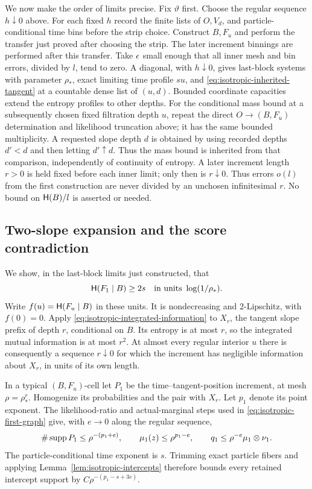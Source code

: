 We now make the order of limits precise. Fix $\vartheta$ first. Choose the regular
sequence $h\downarrow0$ above. For each fixed $h$ record the finite lists of
$O,V_d$, and particle-conditional time bins before the strip choice.
Construct $B,F_u$ and perform the transfer just proved after choosing the
strip. The later increment binnings are performed after this transfer.
Take $\epsilon$ small enough that all inner mesh and bin errors, divided by $l$,
tend to zero. A diagonal,
with $h\downarrow0$, gives last-block systems with parameter $\rho_*$, exact
limiting time profile $su$, and \eqref{eq:isotropic-inherited-tangent} at a
countable dense list of $(u,d)$. Bounded coordinate capacities extend the
entropy profiles to other depths. For the conditional mass bound at a
subsequently chosen fixed filtration depth $u$, repeat the direct
$O\to(B,F_u)$ determination and likelihood truncation above; it has the
same bounded multiplicity. A requested slope depth $d$ is obtained by
using recorded depths $d'<d$ and then letting $d'\uparrow d$.
Thus the mass bound is inherited from that comparison, independently
of continuity of entropy. A later increment length $r>0$ is held fixed before
each inner limit; only then is $r\downarrow0$. Thus errors $o(l)$ from the
first construction are never divided by an unchosen infinitesimal $r$.
No bound on $\mathsf H(B)/l$ is asserted or needed.

\subsection{Two-slope expansion and the score contradiction}

We show, in the last-block limits just constructed, that
\begin{equation}
 \mathsf H(F_1\mid B)\geq2s
 \quad\text{in units }\log(1/\rho_*).
 \label{eq:isotropic-last-entropy}
\end{equation}
Write $f(u)=\mathsf H(F_u\mid B)$ in these units. It is nondecreasing and
$2$-Lipschitz, with $f(0)=0$. Apply
\eqref{eq:isotropic-integrated-information} to $X_r$, the tangent slope
prefix of depth $r$, conditional on $B$. Its entropy is at most $r$, so the
integrated mutual information is at most $r^2$. At almost every regular
interior $u$ there is consequently a sequence $r\downarrow0$ for which the
increment has negligible information about $X_r$, in units of its own length.

In a typical $(B,F_u)$-cell let $P_1$ be the time--tangent-position increment,
at mesh $\rho=\rho_*^r$. Homogenize its probabilities and the pair with $X_r$.
Let $p_1$ denote its point exponent. The likelihood-ratio and actual-marginal
steps used in \eqref{eq:isotropic-first-graph} give, with $e\to0$ along the
regular sequence,
\[
 \#\operatorname{supp} P_1\leq\rho^{-(p_1+e)},\qquad
 \mu_1(z)\leq\rho^{p_1-e},\qquad
 q_1\leq\rho^{-e}\mu_1\otimes\nu_1.
\]
The particle-conditional time exponent is $s$. Trimming exact particle
fibers and applying Lemma~\ref{lem:isotropic-intercepts} therefore bounds
every retained intercept support by $C\rho^{-(p_1-s+3e)}$.

